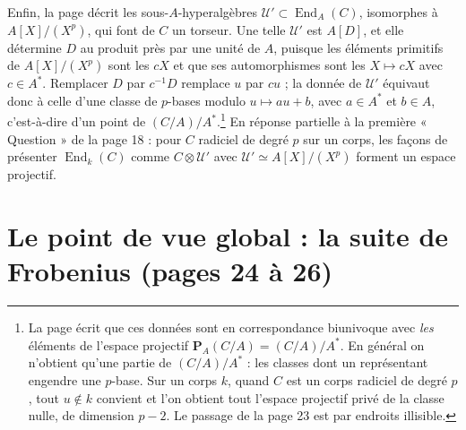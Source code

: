 \documentclass[11pt,a4paper]{article}
\begin{document}
Enfin, la page décrit les
sous-$A$-hyperalgèbres $\mathcal{U}' \subset \operatorname{End}_A(C)$,
isomorphes à $A[X]/(X^p)$, qui font de $C$ un torseur. Une telle
$\mathcal{U}'$ est $A[D]$, et elle détermine $D$ au produit près par une unité
de $A$, puisque les éléments primitifs de $A[X]/(X^p)$ sont les $cX$ et que
ses automorphismes sont les $X \mapsto cX$ avec $c \in A^*$. Remplacer $D$ par
$c^{-1} D$ remplace $u$ par $cu$ ; la donnée de $\mathcal{U}'$ équivaut donc à
celle d'une classe de $p$-bases modulo $u \mapsto au + b$, avec $a \in A^*$ et
$b \in A$, c'est-à-dire d'un point de $(C/A)/A^*$.\footnote{La page écrit que
ces données sont en correspondance biunivoque avec \emph{les} éléments de
l'espace projectif $\mathbf{P}_A(C/A) = (C/A)/A^*$. En général on n'obtient
qu'une partie de $(C/A)/A^*$ : les classes dont un représentant engendre une
$p$-base. Sur un corps $k$, quand $C$ est un corps radiciel de degré $p$, tout
$u \notin k$ convient et l'on obtient tout l'espace projectif privé de la
classe nulle, de dimension $p - 2$. Le passage de la page 23 est par endroits
illisible.} En réponse partielle à la première « Question » de la page 18 :
pour $C$ radiciel de degré $p$ sur un corps, les façons de présenter
$\operatorname{End}_k(C)$ comme $C \otimes \mathcal{U}'$ avec
$\mathcal{U}' \simeq A[X]/(X^p)$ forment un espace projectif.

\section*{Le point de vue global : la suite de Frobenius (pages 24 à 26)}
\end{document}
